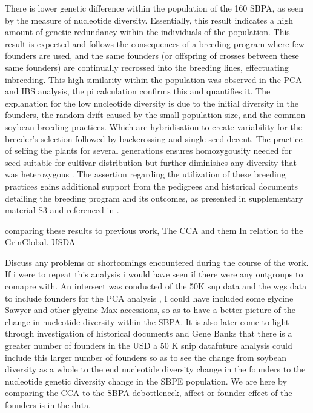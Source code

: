 \documentclass[9pt, twocolumn,twoside]{gsajnl}
\begin{document}
There is lower  genetic difference within the population of the 160 SBPA, as seen by the measure of nucleotide diversity. Essentially, this result indicates a high amount of genetic redundancy within the individuals of the population. This result is expected and follows the consequences of a breeding program where few founders are used, and the same founders (or offspring of crosses between these same founders) are continually recrossed into the breeding lines, effectuating inbreeding. This high similarity within the population was observed in the PCA and IBS analysis, the pi calculation confirms this and quantifies it. The explanation for the low nucleotide diversity is due to the initial diversity in the founders, the random drift caused by the small population size, and the common soybean breeding practices. Which are hybridisation to create variability for the breeder's selection followed by backcrossing and single seed decent. The practice of selfing the plants for several generations ensures homozygousity needed for seed suitable for cultivar distribution but further diminishes any diversity that was heterozygous \cite{acquaah12}. The assertion regarding the utilization of these breeding practices gains additional support from the pedigrees and historical documents detailing the breeding program and its outcomes, as presented in supplementary material S3 and referenced in  \cite{holmberg1973}.   

comparing these results to previous work, 
The CCA and them In relation to the GrinGlobal. USDA 

Discuss any problems or shortcomings encountered during the course of the work.
If i were to repeat this analysis i would have seen if there were any outgroups to comapre with. An  intersect was conducted of the 50K snp data and the wgs data to include founders for the PCA analysis , I could have included some glycine Sawyer and other glycine Max accessions, so as to have a better picture of the change in nucleotide diversity within the SBPA. It is also later come to light through investigation of historical documents and Gene Banks that there is a greater number of founders in the USD a 50 K snip datafuture analysis could include this larger number of founders so as to see the change from soybean diversity as a whole to the end nucleotide diversity change in the founders to the nucleotide genetic diversity change in the SBPE population. We are here by comparing the CCA to the SBPA debottleneck, affect or founder effect of the founders is in the data.  
\end{document}
